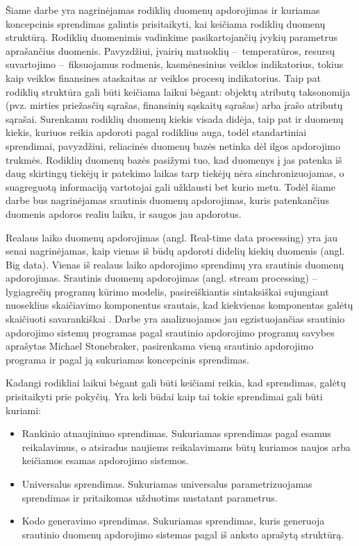 \documentclass{VUMIFPSbakalaurinis}
\begin{document}
\tableofcontents

 
Šiame darbe yra nagrinėjamas rodiklių duomenų apdorojimas ir kuriamas koncepcinis sprendimas galintis prisitaikyti, kai keičiama rodiklių duomenų struktūrą. Rodiklių duomenimis vadinkime pasikartojančių įvykių parametrus aprašančius duomenis. Pavyzdžiui, įvairių matuoklių – temperatūros, resursų suvartojimo – fiksuojamus rodmenis, kasmėnesinius veiklos indikatorius, tokius kaip veiklos finansines ataskaitas ar veiklos procesų indikatorius. Taip pat rodiklių struktūra gali būti keičiama laikui bėgant: objektų atributų taksonomija (pvz. mirties priežasčių sąrašas, finansinių sąskaitų sąrašas) arba įrašo atributų sąrašai. Surenkamu rodiklių duomenų kiekis visada didėja, taip pat ir duomenų kiekis, kuriuos reikia apdoroti pagal rodiklius auga, todėl standartiniai sprendimai, pavyzdžiui, reliacinės duomenų bazės netinka dėl ilgos apdorojimo trukmės. Rodiklių duomenų bazės pasižymi tuo, kad duomenys į jas patenka iš daug skirtingų tiekėjų ir patekimo laikas tarp tiekėjų nėra sinchronizuojamas, o suagreguotą informaciją vartotojai gali užklausti bet kurio metu. Todėl šiame darbe bus nagrinėjamas srautinis duomenų apdorojimas, kuris patenkančius duomenis apdoros realiu laiku, ir saugos jau apdorotus. \par
Realaus laiko duomenų apdorojimas (angl. Real-time data processing) yra jau senai nagrinėjamas, kaip vienas iš būdų apdoroti didelių kiekių duomenis (angl. Big data). Vienas iš realaus laiko apdorojimo sprendimų yra srautinis duomenų apdorojimas. Srautinis duomenų apdorojimas (angl. stream processing) – lygiagrečių programų kūrimo modelis, pasireiškiantis sintaksiškai sujungiant nuoseklius skaičiavimo komponentus srautais, kad kiekvienas komponentas galėtų skaičiuoti savarankiškai \cite{shortstreamproc}. Darbe yra analizuojamos jau egzistuojančias srautinio apdorojimo sistemų programas pagal srautinio apdorojimo programų savybes aprašytas Michael Stonebraker, pasirenkama vieną srautinio apdorojimo programa ir pagal ją sukuriamas koncepcinis sprendimas. 
\par
Kadangi rodikliai laikui bėgant gali būti keičiami reikia, kad sprendimas, galėtų prisitaikyti prie pokyčių. Yra keli būdai kaip tai tokie sprendimai gali būti kuriami:
\begin{itemize}
    \item Rankinio atnaujinimo sprendimas. Sukuriamas sprendimas pagal esamus reikalavimus, o atsiradus naujiems reikalavimams būtų kuriamos naujos arba keičiamos esamas apdorojimo sistemos. 
    \item Universalus sprendimas. Sukuriamas universalus parametrizuojamas sprendimas ir pritaikomas užduotims nustatant parametrus.
    \item Kodo generavimo sprendimas. Sukuriamas sprendimas, kuris generuoja srautinio duomenų apdorojimo sistemas pagal iš anksto aprašytą struktūrą.  
\end{itemize}   
\end{document}

